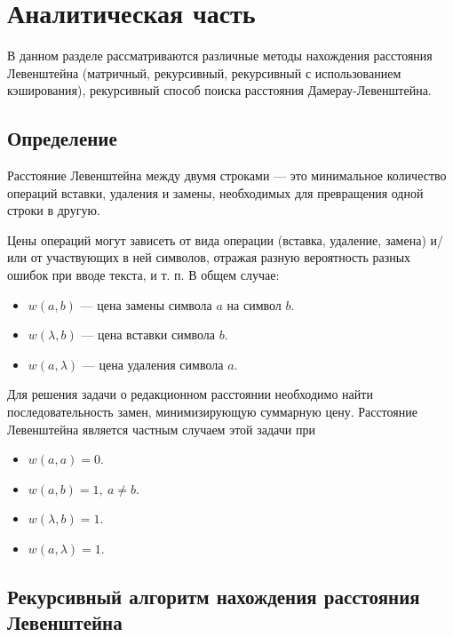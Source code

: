\chapter{Аналитическая часть}
\newcommand\tab[1][1cm]{\hspace*{#1}}

В данном разделе рассматриваются различные методы нахождения расстояния Левенштейна (матричный, рекурсивный, рекурсивный с использованием кэширования), рекурсивный способ поиска расстояния Дамерау-Левенштейна.

\section{Определение}
Расстояние Левенштейна \cite{Leshenko} между двумя строками — это минимальное количество операций вставки, удаления и замены, необходимых для превращения одной строки в другую.

Цены операций могут зависеть от вида операции (вставка, удаление, замена) и/или от участвующих в ней символов, отражая разную вероятность разных ошибок при вводе текста, и т. п. В общем случае:
\begin{itemize}
	\item $w(a,b)$ — цена замены символа $a$ на символ $b$.
	\item $w(\lambda,b)$ — цена вставки символа $b$.
	\item $w(a,\lambda)$ — цена удаления символа $a$.
\end{itemize}

Для решения задачи о редакционном расстоянии необходимо найти последовательность замен, минимизирующую суммарную цену. Расстояние Левенштейна является частным случаем этой задачи при
\begin{itemize}
	\item $w(a,a)=0$.
	\item $w(a,b)=1, \medspace a \neq b$.
	\item $w(\lambda,b)=1$.
	\item $w(a,\lambda)=1$.
\end{itemize}

\clearpage

\section{Рекурсивный алгоритм нахождения расстояния Левенштейна}

